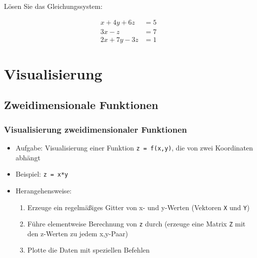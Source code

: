     \secMexercise
    \begin{frame}
        \frameMexercise
        \begin{exercise}
            \sloppy
            Lösen Sie das Gleichungssystem:

            \begin{align*}
                x + 4y + 6z  &= 5 \\
                3x - z &= 7 \\
                2x + 7y -3z &= 1
            \end{align*}

        \end{exercise}
    \end{frame}

    \section{Visualisierung}

    \subsection{Zweidimensionale Funktionen}
    \begin{frame}
        \frametitle{Visualisierung zweidimensionaler Funktionen}
        \begin{itemize}
            \item Aufgabe: Visualisierung einer Funktion \texttt{z = f(x,y)}, die von zwei Koordinaten abhängt
            \item Beispiel: \texttt{z = x*y}
            \item Herangehensweise:
            \begin{enumerate}
                \item Erzeuge ein regelmäßiges Gitter von x- und y-Werten (Vektoren \texttt{X} und \texttt{Y})
                \item Führe elementweise Berechnung von \texttt{z} durch (erzeuge eine Matrix \texttt{Z} mit den z-Werten zu jedem x,y-Paar)
                \item Plotte die Daten mit speziellen Befehlen
            \end{enumerate}
        \end{itemize}
    \end{frame}

